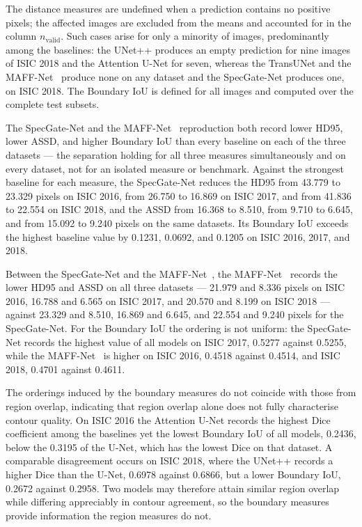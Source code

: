 The distance measures are undefined when a prediction contains no positive pixels; the affected images are excluded from the means and accounted for in the column $n_{\mathrm{valid}}$. Such cases arise for only a minority of images, predominantly among the baselines: the UNet++ produces an empty prediction for nine images of ISIC 2018 and the Attention U-Net for seven, whereas the TransUNet and the MAFF-Net~\cite{ref15} produce none on any dataset and the SpecGate-Net produces one, on ISIC 2018. The Boundary IoU is defined for all images and computed over the complete test subsets.

The SpecGate-Net and the MAFF-Net~\cite{ref15} reproduction both record lower HD95, lower ASSD, and higher Boundary IoU than every baseline on each of the three datasets --- the separation holding for all three measures simultaneously and on every dataset, not for an isolated measure or benchmark. Against the strongest baseline for each measure, the SpecGate-Net reduces the HD95 from 43.779 to 23.329 pixels on ISIC 2016, from 26.750 to 16.869 on ISIC 2017, and from 41.836 to 22.554 on ISIC 2018, and the ASSD from 16.368 to 8.510, from 9.710 to 6.645, and from 15.092 to 9.240 pixels on the same datasets. Its Boundary IoU exceeds the highest baseline value by 0.1231, 0.0692, and 0.1205 on ISIC 2016, 2017, and 2018.

Between the SpecGate-Net and the MAFF-Net~\cite{ref15}, the MAFF-Net~\cite{ref15} records the lower HD95 and ASSD on all three datasets --- 21.979 and 8.336 pixels on ISIC 2016, 16.788 and 6.565 on ISIC 2017, and 20.570 and 8.199 on ISIC 2018 --- against 23.329 and 8.510, 16.869 and 6.645, and 22.554 and 9.240 pixels for the SpecGate-Net. For the Boundary IoU the ordering is not uniform: the SpecGate-Net records the highest value of all models on ISIC 2017, 0.5277 against 0.5255, while the MAFF-Net~\cite{ref15} is higher on ISIC 2016, 0.4518 against 0.4514, and ISIC 2018, 0.4701 against 0.4611.

The orderings induced by the boundary measures do not coincide with those from region overlap, indicating that region overlap alone does not fully characterise contour quality. On ISIC 2016 the Attention U-Net records the highest Dice coefficient among the baselines yet the lowest Boundary IoU of all models, 0.2436, below the 0.3195 of the U-Net, which has the lowest Dice on that dataset. A comparable disagreement occurs on ISIC 2018, where the UNet++ records a higher Dice than the U-Net, 0.6978 against 0.6866, but a lower Boundary IoU, 0.2672 against 0.2958. Two models may therefore attain similar region overlap while differing appreciably in contour agreement, so the boundary measures provide information the region measures do not.

